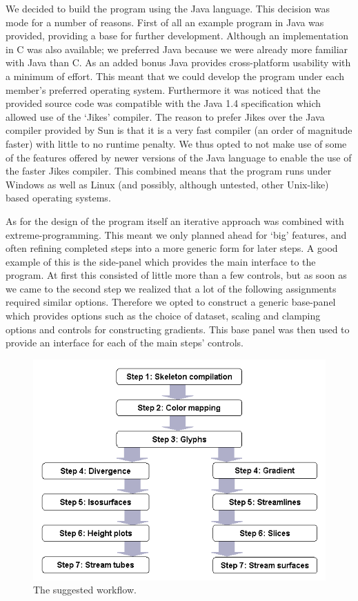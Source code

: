 \documentclass[a4paper,11pt,twoside]{report}
\begin{document}
	We decided to build the program using the Java language. This decision was mode for a number of reasons. First of all an example program in Java was provided, providing a base for further development. Although an implementation in C was also available; we preferred Java because we were already more familiar with Java than C. As an added bonus Java provides cross-platform usability with a minimum of effort. This meant that we could develop the program under each member's preferred operating system. Furthermore it was noticed that the provided source code was compatible with the Java 1.4 specification which allowed use of the `Jikes' compiler. The reason to prefer Jikes over the Java compiler provided by Sun is that it is a very fast compiler (an order of magnitude faster) with little to no runtime penalty. We thus opted to not make use of some of the features offered by newer versions of the Java language to enable the use of the faster Jikes compiler. This combined means that the program runs under Windows as well as Linux (and possibly, although untested, other Unix-like) based operating systems.

	As for the design of the program itself an iterative approach was combined with extreme-programming. This meant we only planned ahead for `big' features, and often refining completed steps into a more generic form for later steps. A good example of this is the side-panel which provides the main interface to the program. At first this consisted of little more than a few controls, but as soon as we came to the second step we realized that a lot of the following assignments required similar options. Therefore we opted to construct a generic base-panel which provides options such as the choice of dataset, scaling and clamping options and controls for constructing gradients. This base panel was then used to provide an interface for each of the main steps' controls.

	\begin{figure}[h]
	\centering
	\includegraphics[scale=\imagescalefactor]{images/overview.png}
	\caption{The suggested workflow.}\label{fig:overview}
	\end{figure}
\end{document}

